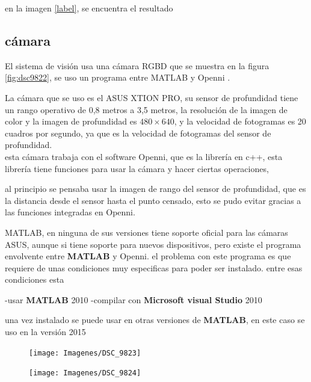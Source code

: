 en la imagen \ref{label}, se encuentra el resultado




\subsection{cámara}

El sistema de visión usa una cámara RGBD que se muestra en la figura \ref{fig:dsc9822}, se uso un programa entre MATLAB y Openni \cite{matlabwrapper}.

La cámara que se uso es el ASUS XTION PRO, su sensor de profundidad tiene un rango operativo de 0,8 metros a 3,5 metros, la resolución de la imagen de color y la imagen de profundidad es $480 \times640$, y la velocidad de fotogramas es 20 cuadros por segundo, ya que es la velocidad de fotogramas del sensor de profundidad. \\

esta cámara trabaja con el software Openni, que es la librería en c++, esta librería tiene funciones para usar la cámara y hacer ciertas operaciones,

al principio se pensaba usar la imagen de rango del sensor de profundidad, que es la distancia desde el sensor hasta el punto censado, esto se pudo evitar gracias a las funciones integradas en Openni.

MATLAB, en ninguna de sus versiones tiene soporte oficial para las cámaras ASUS, aunque si tiene soporte para nuevos dispositivos, pero existe el programa envolvente entre \textbf{MATLAB} y Openni.
el problema con este programa es que requiere de unas condiciones muy especificas para poder ser instalado. entre esas condiciones esta

-usar \textbf{MATLAB} 2010
-compilar con \textbf{Microsoft visual Studio} 2010


una vez instalado se puede usar en otras versiones de \textbf{MATLAB}, en este caso se uso en la versión 2015


\begin{figure}
	\centering
	\texttt{[image: Imagenes/DSC\_9823]}
	\caption{}
	\label{fig:dsc9823}
\end{figure}
\begin{figure}
	\centering
	\texttt{[image: Imagenes/DSC\_9824]}
	\caption{}
	\label{fig:dsc9824}
\end{figure}





